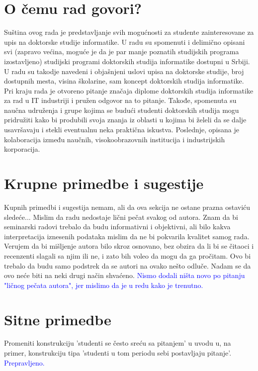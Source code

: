 \documentclass[a4paper]{report}
\newcommand{\odgovor}[1]{\textcolor{blue}{#1}}
\begin{document}
\section{O čemu rad govori?}
Suština ovog rada je predstavljanje svih mogućnosti za studente zainteresovane za upis na doktorske 
studije informatike. U radu su spomenuti i delimično opisani svi (zapravo većina, moguće je da je par 
manje 
poznatih studijskih programa izostavljeno) studijski programi doktorskih studija informatike dostupni u 
Srbiji. U radu su takodje navedeni i objašnjeni uslovi upisa na doktorske studije, broj dostupnih mesta, 
visina školarine, sam koncept doktorskih studija informatike. Pri kraju rada je otvoreno pitanje značaja 
diplome doktorskih studija informatike za rad u IT industriji i pružen odgovor na to pitanje. Takođe, 
spomenuta su naučna udruženja i grupe kojima se budući studenti doktorskih studija mogu pridružiti kako 
bi produbili svoja znanja iz oblasti u kojima bi želeli da se dalje usavršavaju i stekli eventualnu neka 
praktična iskustva. Poslednje, opisana je kolaboracija između naučnih, visokoobrazovnih institucija i 
industrijskih korporacija.

\section{Krupne primedbe i sugestije}
Kupnih primedbi i sugestija nemam, ali da ova sekcija ne ostane prazna ostaviću sledeće...
Mislim da radu nedostaje lični pečat svakog od autora. Znam da bi seminarski radovi trebalo da 
budu informativni i objektivni, ali bilo kakva interpretacija iznesenih podataka mislim da ne bi 
pokvarila kvalitet samog rada. Verujem da bi mišljenje autora bilo skroz osnovano, 
bez obzira da li bi se čitaoci i recenzenti slagali sa njim ili ne, i zato bih voleo da mogu da ga 
pročitam. Ovo bi trebalo da budu samo podstrek da se autori na ovako nešto odluče. Nadam se da 
ovo neće biti na neki drugi način shvaćeno. \odgovor{Nismo dodali ništa novo po pitanju "ličnog pečata autora", jer mislimo da je u redu kako je trenutno.}

\section{Sitne primedbe}
Promeniti konstrukciju 'studenti se često sreću sa pitanjem' u uvodu u, na primer, konstrukciju tipa
'studenti u tom periodu sebi postavljaju pitanje'.
\odgovor{Prepravljeno.}
\end{document}
